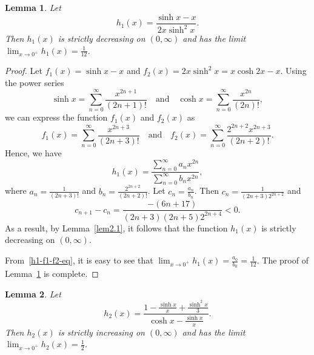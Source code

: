 \documentclass[reqno,a4paper]{amsart}
\numberwithin{equation}{section}
\theoremstyle{plain}
\newtheorem{lem}{Lemma}[section]
\theoremstyle{remark}
\begin{document}
\begin{lem}\label{lem2.2-h1}
Let
\begin{equation}
h_1(x)=\frac{\sinh x-x}{2x\sinh^2x}.
\end{equation}
Then $h_1(x)$ is strictly decreasing on $(0,\infty)$ and has the limit $\lim_{x\to0^+}h_1(x)=\frac1{12}$.
\end{lem}

\begin{proof}
Let
$f_1(x)=\sinh x-x$ and $f_2(x)=2x\sinh^2x=x\cosh2x-x$.
Using the power series
\begin{equation}\label{sinh-cosh-series}
\sinh x=\sum_{n=0}^{\infty}\frac{x^{2n+1}}{(2n+1)!} \quad\text{and}\quad
\cosh x=\sum_{n=0}^{\infty}\frac{x^{2n}}{(2n)!},
\end{equation}
we can express the function $f_1(x)$ and $f_2(x)$ as
\begin{equation}\label{h1-f1=eq1}
f_1(x)=\sum_{n=0}^{\infty}\frac{x^{2n+3}}{(2n+3)!}\quad
\text{and}\quad
f_2(x)=\sum_{n=0}^{\infty}\frac{2^{2n+2}x^{2n+3}}{(2n+2)!}.
\end{equation}
Hence, we have
\begin{equation}\label{h1-f1-f2-eq}
h_1(x)=\frac{\sum_{n=0}^{\infty}a_nx^{2n}}{\sum_{n=0}^{\infty}b_nx^{2n}},
\end{equation}
where $a_n=\frac1{(2n+3)!}$ and $b_n=\frac{2^{2n+2}}{(2n+2)!}$.
Let $c_n=\frac{a_n}{b_n}$. Then $c_n=\frac1{(2n+3)2^{2n+2}}$ and
\begin{equation*}
c_{n+1}-c_n=\frac{-(6n+17)}{(2n+3)(2n+5)2^{2n+4}}<0.
\end{equation*}
As a result, by Lemma~\ref{lem2.1}, it follows that the function $h_1(x)$ is strictly decreasing
on $(0,\infty)$.
\par
From~\eqref{h1-f1-f2-eq}, it is easy to see that $\lim_{x\to0^+}h_1(x)=\frac{a_0}{b_0}=\frac1{12}$.
The proof of Lemma~\ref{lem2.2-h1} is complete.
\end{proof}

\begin{lem}\label{lem2.3-h2}
Let
\begin{equation}
h_2(x)=\frac{1-\frac{\sinh x}x+\frac{\sinh^2x}3}{\cosh x-\frac{\sinh x}x}.
\end{equation}
Then $h_2(x)$ is strictly increasing on $(0,\infty)$ and has the limit $\lim_{x\to0^+}h_2(x)=\frac12$.
\end{lem}
\end{document}
